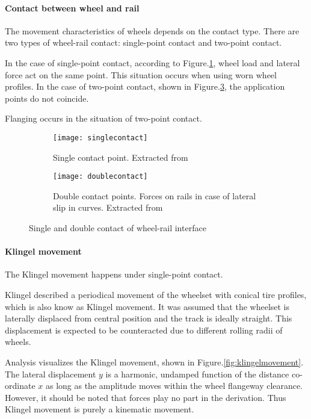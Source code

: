\paragraph{Contact between wheel and rail}

The movement characteristics of wheels depends on the contact type. There are two types of wheel-rail contact: single-point contact and two-point contact.

In the case of single-point contact, according to Figure.\ref{fig:singlecontact}, wheel load and lateral force act on the same point. This situation occurs when using worn wheel profiles. In the case of two-point contact, shown in Figure.\ref{fig:doublecontract}, the application points do not coincide.

Flanging occurs in the situation of two-point contact. 

\begin{figure}[h!]
\centering
    \begin{subfigure}[b]{0.2\textwidth}
        \centering
        \texttt{[image: singlecontact]}
        \caption{Single contact point.  Extracted from \citep[Figure 2.13]{esveld2001modern}}
        \label{fig:singlecontact}
    \end{subfigure}
    \begin{subfigure}[b]{0.5\textwidth}
        \texttt{[image: doublecontact]}
        \caption{Double contact points. Forces on rails in case of lateral slip in curves. Extracted from \citep[Figure 2.14]{esveld2001modern}}
        \label{fig:doublecontract}
    \end{subfigure}
    \caption{Single and double contact of wheel-rail interface}
\end{figure}

\paragraph{Klingel movement}

The Klingel movement happens under single-point contact.

Klingel described a periodical movement of the wheelset with conical tire profiles, which is also know as Klingel movement. It was assumed that the wheelset is laterally displaced from central position and the track is ideally straight. This displacement is expected to be counteracted due to different rolling radii of wheels. 

Analysis visualizes the Klingel movement, shown in Figure.\ref{fig:klingelmovement}. The lateral displacement $y$ is a harmonic, undamped function of the distance co-ordinate $x$ as long as the amplitude moves within the wheel flangeway clearance. However, it should be noted that forces play no part in the derivation. Thus Klingel movement is purely a kinematic movement.

